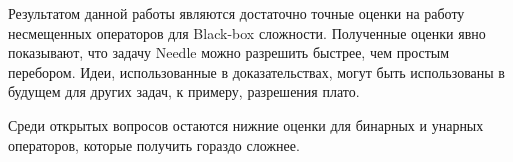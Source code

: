 \startconclusionpage

Результатом данной работы являются достаточно точные оценки на работу несмещенных операторов для Black-box сложности. Полученные оценки явно показывают, что задачу Needle можно разрешить быстрее, чем простым перебором. Идеи, использованные в доказательствах, могут быть использованы в будущем для других задач, к примеру, разрешения плато.

Среди открытых вопросов остаются нижние оценки для бинарных и унарных операторов, которые получить гораздо сложнее.